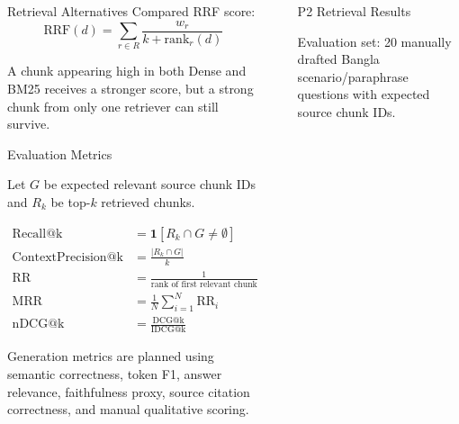 \documentclass[final]{beamer}
\newlength{\sepwidth}
\newlength{\colwidth}
\newcommand{\separatorcolumn}{\begin{column}{\sepwidth}\end{column}}
\begin{document}
\begin{frame}[t]
\begin{columns}[t]
\begin{column}{\colwidth}
\begin{block}{Retrieval Alternatives Compared}
    \vspace{0.4em}
    RRF score:
    \[
      \mathrm{RRF}(d) =
      \sum_{r \in R}
      \frac{w_r}{k + \mathrm{rank}_r(d)}
    \]

    A chunk appearing high in both Dense and BM25 receives a stronger score,
    but a strong chunk from only one retriever can still survive.

  \end{block}

  \begin{exampleblock}{Evaluation Metrics}

    Let $G$ be expected relevant source chunk IDs and $R_k$ be top-$k$
    retrieved chunks.

    \begin{align*}
      \mathrm{Recall@k} &= \mathbf{1}[R_k \cap G \neq \emptyset] \\
      \mathrm{ContextPrecision@k} &= \frac{|R_k \cap G|}{k} \\
      \mathrm{RR} &= \frac{1}{\text{rank of first relevant chunk}} \\
      \mathrm{MRR} &= \frac{1}{N}\sum_{i=1}^{N}\mathrm{RR}_i \\
      \mathrm{nDCG@k} &= \frac{\mathrm{DCG@k}}{\mathrm{IDCG@k}}
    \end{align*}

    Generation metrics are planned using semantic correctness, token F1,
    answer relevance, faithfulness proxy, source citation correctness, and
    manual qualitative scoring.

  \end{exampleblock}

\end{column}

\separatorcolumn


\begin{column}{\colwidth}

  \begin{block}{P2 Retrieval Results}

    Evaluation set: 20 manually drafted Bangla scenario/paraphrase questions
    with expected source chunk IDs.


\end{block}
\end{column}
\end{columns}
\end{frame}
\end{document}
